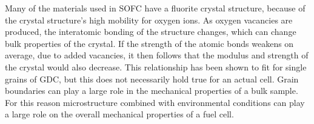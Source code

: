 Many of the materials used in SOFC have a fluorite crystal structure, because of the crystal structure's high mobility for oxygen ions.
As oxygen vacancies are produced, the interatomic bonding of the structure changes, which can change bulk properties of the crystal.\cite{Bishop2014,Duncan2006}
If the strength of the atomic bonds weakens on average, due to added vacancies, it then follows that the modulus and strength of the crystal would also decrease.
This relationship has been shown to fit for single grains of GDC, but this does not necessarily hold true for an actual cell.\cite{Wang2007}
Grain boundaries can play a large role in the mechanical properties of a bulk sample.
For this reason microstructure combined with environmental conditions can play a large role on the overall mechanical properties of a fuel cell.
